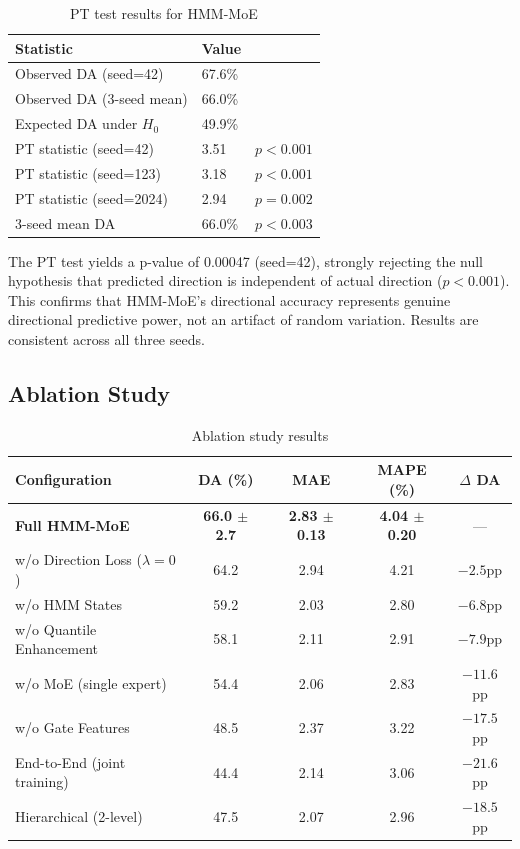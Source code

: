 \documentclass[3p,times]{elsarticle}
\begin{document}
\begin{table}[htbp]
\centering
\caption{PT test results for HMM-MoE}
\label{tab:pt}
\begin{tabular}{lll}
\toprule
Statistic & Value & \\
\midrule
Observed DA (seed=42) & 67.6\% & \\
Observed DA (3-seed mean) & 66.0\% & \\
Expected DA under $H_0$ & 49.9\% & \\
PT statistic (seed=42) & 3.51 & $p < 0.001$ \\
PT statistic (seed=123) & 3.18 & $p < 0.001$ \\
PT statistic (seed=2024) & 2.94 & $p = 0.002$ \\
3-seed mean DA & 66.0\% & $p < 0.003$ \\
\bottomrule
\end{tabular}
\end{table}

The PT test yields a p-value of 0.00047 (seed=42), strongly rejecting the null hypothesis that predicted direction is independent of actual direction ($p < 0.001$). This confirms that HMM-MoE's directional accuracy represents genuine directional predictive power, not an artifact of random variation. Results are consistent across all three seeds.

\subsection{Ablation Study}
\label{sec:ablation}

\begin{table}[htbp]
\centering
\caption{Ablation study results}
\label{tab:ablation}
\begin{tabular}{lcccc}
\toprule
Configuration & DA (\%) & MAE & MAPE (\%) & $\Delta$ DA \\
\midrule
\textbf{Full HMM-MoE} & \textbf{66.0 $\pm$ 2.7} & \textbf{2.83 $\pm$ 0.13} & \textbf{4.04 $\pm$ 0.20} & --- \\
w/o Direction Loss ($\lambda=0$) & 64.2 & 2.94 & 4.21 & $-2.5$pp \\
w/o HMM States & 59.2 & 2.03 & 2.80 & $-6.8$pp \\
w/o Quantile Enhancement & 58.1 & 2.11 & 2.91 & $-7.9$pp \\
w/o MoE (single expert) & 54.4 & 2.06 & 2.83 & $-11.6$pp \\
w/o Gate Features & 48.5 & 2.37 & 3.22 & $-17.5$pp \\
End-to-End (joint training) & 44.4 & 2.14 & 3.06 & $-21.6$pp \\
Hierarchical (2-level) & 47.5 & 2.07 & 2.96 & $-18.5$pp \\
\bottomrule
\end{tabular}
\end{table}
\end{document}

